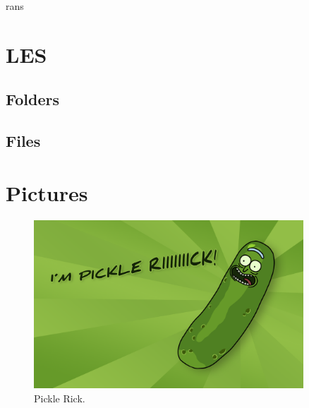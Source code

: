 rans


\section{LES}

\subsection{Folders}

\subsection{Files}


\section{Pictures}

\begin{figure}[h!]
\centering 
\includegraphics[width=0.9\textwidth]{Figures/pickle_rick.png}
\caption{Pickle Rick.}
\label{pickle_rick}
\end{figure}



